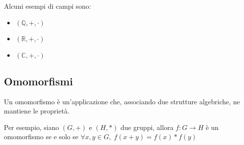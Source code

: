 \documentclass{article}
\begin{document}
    \vspace{10pt}
    Alcuni esempi di campi sono:
    \begin{itemize}
        \item $(\mathbb{Q}, +, \cdot)$ 
        \item $(\mathbb{R}, +, \cdot)$ 
        \item $(\mathbb{C}, +, \cdot)$ 
    \end{itemize}



\subsection{Omomorfismi}
    Un omomorfismo è un'applicazione che, associando due strutture algebriche, ne mantiene le proprietà.
    
    \vspace{5pt}
    Per esempio, siano $(G, +)$ e $(H, *)$ due gruppi,
    allora $f: G \rightarrow H$ è un omomorfismo se e solo se $\forall x, y \in G, \; f(x + y) = f(x) * f(y)$
\end{document}

